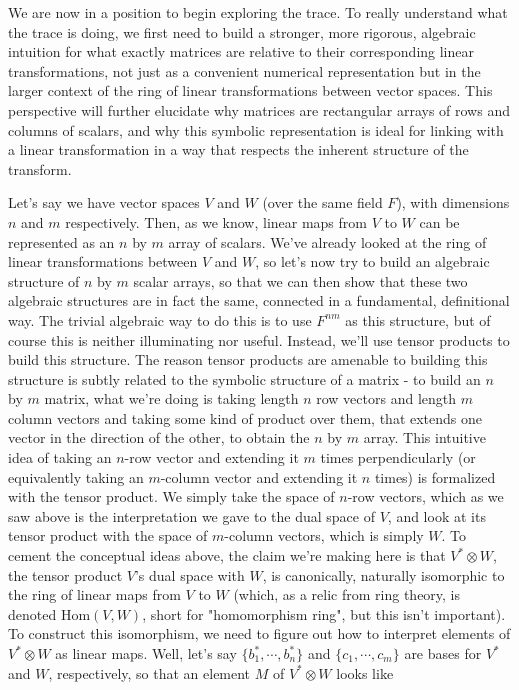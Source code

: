 \documentclass{article}
\newcommand{\n}{\leavevmode \newline}
\newcommand{\nn}{\leavevmode \newline \newline}
\newcommand{\Hom}{\text{Hom}}
\begin{document}
We are now in a position to begin exploring the trace. To really understand what the trace is doing, we first need to build a stronger, more rigorous, algebraic intuition for what exactly matrices are relative to their corresponding linear transformations, not just as a convenient numerical representation but in the larger context of the ring of linear transformations between vector spaces. This perspective will further elucidate why matrices are rectangular arrays of rows and columns of scalars, and why this symbolic representation is ideal for linking with a linear transformation in a way that respects the inherent structure of the transform.
\n
\begin{adjustwidth}{1cm}{1cm}

	Let's say we have vector spaces $ V $ and $ W $ (over the same field $ F $), with dimensions $ n $ and $ m $ respectively. Then, as we know, linear maps from $ V $ to $ W $ can be represented as an $ n $ by $ m $ array of scalars. We've already looked at the ring of linear transformations between $ V $ and $ W $, so let's now try to build an algebraic structure of $ n $ by $ m $ scalar arrays, so that we can then show that these two algebraic structures are in fact the same, connected in a fundamental, definitional way. The trivial algebraic way to do this is to use $ F^{nm} $ as this structure, but of course this is neither illuminating nor useful. Instead, we'll use tensor products to build this structure. The reason tensor products are amenable to building this structure is subtly related to the symbolic structure of a matrix - to build an $ n $ by $ m $ matrix, what we're doing is taking length $ n $ row vectors and length $ m $ column vectors and taking some kind of product over them, that extends one vector in the direction of the other, to obtain the $ n $ by $ m $ array. This intuitive idea of taking an $ n $-row vector and extending it $ m $ times perpendicularly (or equivalently taking an $ m $-column vector and extending it $ n $ times) is formalized with the tensor product. We simply take the space of $ n $-row vectors, which as we saw above is the interpretation we gave to the dual space of $ V $, and look at its tensor product with the space of $ m $-column vectors, which is simply $ W $.
	\nn
	To cement the conceptual ideas above, the claim we're making here is that $ V^* \otimes W $, the tensor product $ V $'s dual space with $ W $, is canonically, naturally isomorphic to the ring of linear maps from $ V $ to $ W $ (which, as a relic from ring theory, is denoted $ \Hom(V, W) $, short for "homomorphism ring", but this isn't important). To construct this isomorphism, we need to figure out how to interpret elements of $ V^* \otimes W $ as linear maps. Well, let's say $ \{ b_1^*, \cdots, b_n^* \} $ and $ \{ c_1, \cdots, c_m \} $ are bases for $ V^* $ and $ W $, respectively, so that an element $ M $ of $ V^* \otimes W $ looks like

\end{adjustwidth}
\end{document}
